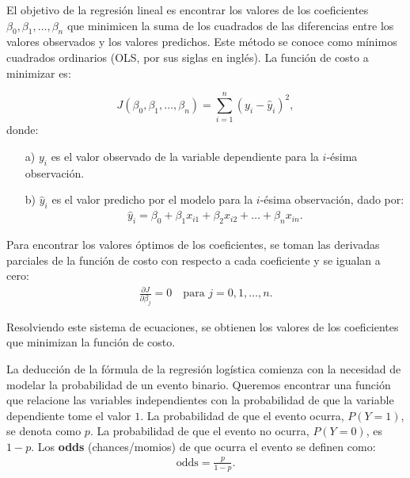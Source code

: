 \documentclass[12pt]{article}
\begin{document}

El objetivo de la regresión lineal es encontrar los valores de los coeficientes $\beta_0, \beta_1, \ldots, \beta_n$ que minimicen la suma de los cuadrados de las diferencias entre los valores observados y los valores predichos. Este método se conoce como mínimos cuadrados ordinarios (OLS, por sus siglas en inglés). La función de costo a minimizar es:

\begin{equation}
J\left(\beta_0, \beta_1, \ldots, \beta_n\right) = \sum_{i=1}^{n}\left(y_i - \hat{y}_i\right)^2,
\end{equation}
donde:
\begin{itemize}
    \item[a) ] $y_i$ es el valor observado de la variable dependiente para la $i$-ésima observación.
    \item[b) ] $\hat{y}_i$ es el valor predicho por el modelo para la $i$-ésima observación, dado por:
    \begin{eqnarray*}
    \hat{y}_i = \beta_0 + \beta_1 x_{i1} + \beta_2 x_{i2} + \ldots + \beta_n x_{in}.
    \end{eqnarray*}
\end{itemize}

Para encontrar los valores óptimos de los coeficientes, se toman las derivadas parciales de la función de costo con respecto a cada coeficiente y se igualan a cero:
\begin{eqnarray*}
\frac{\partial J}{\partial \beta_j} = 0 \quad \text{para } j = 0, 1, \ldots, n.
\end{eqnarray*}

Resolviendo este sistema de ecuaciones, se obtienen los valores de los coeficientes que minimizan la función de costo. 
\medskip

La deducción de la fórmula de la regresión logística comienza con la necesidad de modelar la probabilidad de un evento binario. Queremos encontrar una función que relacione las variables independientes con la probabilidad de que la variable dependiente tome el valor $1$. La probabilidad de que el evento ocurra, $P(Y=1)$, se denota como $p$. La probabilidad de que el evento no ocurra, $P(Y=0)$, es $1-p$. Los \textbf{odds} (chances/momios) de que ocurra el evento se definen como:
\begin{eqnarray*}
\text{odds} = \frac{p}{1-p}.
\end{eqnarray*}
\end{document}
